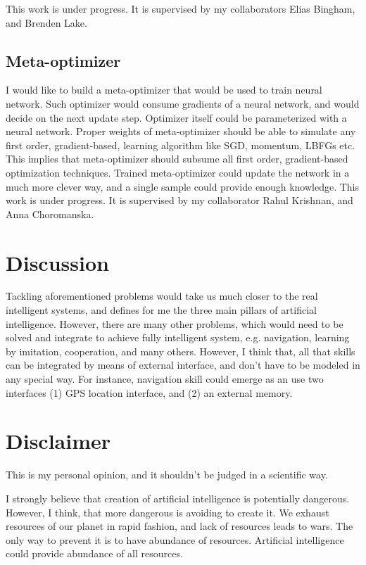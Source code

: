 \documentclass{article}
\begin{document}
This work is under progress. It is supervised by my collaborators Elias Bingham, and Brenden Lake.

\subsection{Meta-optimizer}
\label{subsec:meta}
I would like to build a meta-optimizer that would be used to train neural network.
Such optimizer would consume gradients of a neural network, 
and would decide on the next update step. Optimizer itself could be parameterized 
with a neural network. Proper weights of meta-optimizer should be able to simulate any first order, gradient-based, 
learning algorithm like SGD, momentum, LBFGs etc. This implies that meta-optimizer should 
subsume all first order, gradient-based optimization techniques. Trained meta-optimizer 
could update the network in a much more clever way, and a single sample could provide enough knowledge.
This work is under progress. It is supervised by my collaborator Rahul Krishnan, and Anna Choromanska.

\section{Discussion}
Tackling aforementioned problems would take us much closer to the
real intelligent systems, and defines for me the three main pillars 
of artificial intelligence. However, there are many other problems, which 
would need to be solved and integrate to achieve fully 
intelligent system, e.g. navigation, learning by imitation, cooperation, and many others.
However, I think that, all that skills can be integrated by means of external interface, and
don't have to be modeled in any special way. For instance, navigation skill could emerge 
as an use two interfaces (1) GPS location interface, and (2) an external memory.


\section{Disclaimer}
This is my personal opinion, and it shouldn't be judged in a scientific way.


I strongly believe that creation of artificial intelligence is potentially
dangerous. However, I think, that more dangerous is avoiding to create it.
We exhaust resources of our planet in rapid fashion, and lack of resources 
leads to wars. The only way to prevent it is to have abundance of resources.
Artificial intelligence could provide abundance of all resources.




\end{document}
